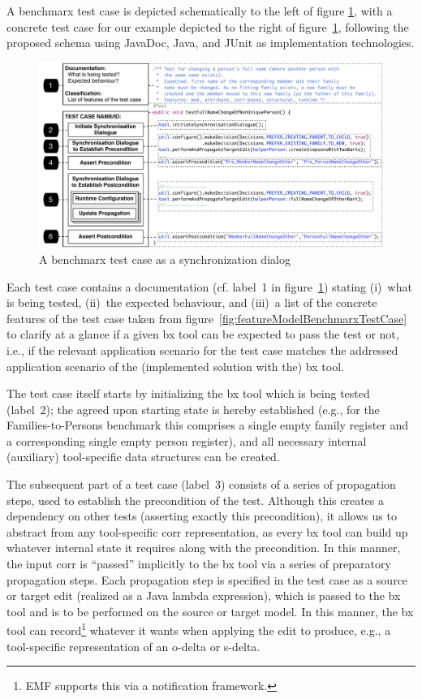 A benchmarx test case is depicted schematically to the left of figure \ref{fig:benchmarxTestCase}, with a concrete test case for our example depicted to the right of figure~\ref{fig:benchmarxTestCase}, following the proposed schema using JavaDoc, Java, and JUnit as implementation technologies.
%
\begin{figure}[tb!]
	\centering
	\includegraphics[width=\columnwidth]{diagrams/testCase}
	\caption{A benchmarx test case as a synchronization dialog}
	\label{fig:benchmarxTestCase}
\end{figure}
%
Each test case contains a documentation (cf. label~1 in figure~\ref{fig:benchmarxTestCase}) stating (i)~what is being tested, (ii)~the expected behaviour, and (iii)~a list of the concrete features of the test case taken from figure~\ref{fig:featureModelBenchmarxTestCase} to clarify at a glance if a given bx tool can be expected to pass the test or not, i.e., if the relevant application scenario for the test case matches the addressed application scenario of the (implemented solution with the) bx tool. 

The test case itself starts by initializing the bx tool which is being tested (label~2); the agreed upon starting state is hereby established (e.g., for the Families-to-Persons benchmark this comprises a single empty family register and a corresponding single empty person register), and all necessary internal (auxiliary) tool-specific data structures can be created.


The subsequent part of a test case (label~3) consists of a series of propagation steps, used to establish the precondition of the test. 
Although this creates a dependency on other tests (asserting exactly this precondition), it allows us to abstract from any tool-specific corr representation, as every bx tool can build up whatever internal state it requires along with the precondition. 
In this manner, the input corr is ``passed'' implicitly to the bx tool via a series of preparatory propagation steps.
Each propagation step is specified in the test case as a source or target edit (realized as a Java lambda expression), which is passed to the bx tool and is to be performed on the source or target model.
In this manner, the bx tool can record\footnote{EMF supports this via a notification framework.} whatever it wants when applying the edit to produce, e.g., a tool-specific representation of an o-delta or s-delta.

